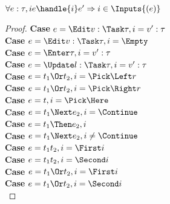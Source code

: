\begin{theorem}
  $\forall e:\tau, i e\handle{i}e' \implies i\in\Inputs{(e)}$
\end{theorem}

\begin{proof}
  \noindent\textbf{Case} $e=\Edit v:\Task\tau, i= v':\tau$\\
  \noindent\textbf{Case} $e=\Edit v:\Task\tau, i= \Empty$\\
  \noindent\textbf{Case} $e=\Enter \tau, i= v':\tau$\\
  \noindent\textbf{Case} $e=\Update l:\Task\tau, i= v':\tau$\\
  \noindent\textbf{Case} $e=t_1\Or t_2 , i= \Pick\Left r $\\
  \noindent\textbf{Case} $e=t_1\Or t_2 , i= \Pick\Right r $\\
  \noindent\textbf{Case} $e=t, i= \Pick\Here $\\
  \noindent\textbf{Case} $e=t_1\Next e_2 , i= \Continue $\\
  \noindent\textbf{Case} $e=t_1\Then e_2 , i$\\
  \noindent\textbf{Case} $e=t_1\Next e_2 , i\neq\Continue$\\
  \noindent\textbf{Case} $e=t_1\And t_2 , i=\First i$\\
  \noindent\textbf{Case} $e=t_1\And t_2 , i=\Second i$\\
  \noindent\textbf{Case} $e=t_1\Or t_2 , i=\First i$\\
  \noindent\textbf{Case} $e=t_1\Or t_2 , i=\Second i$\\
\end{proof}

